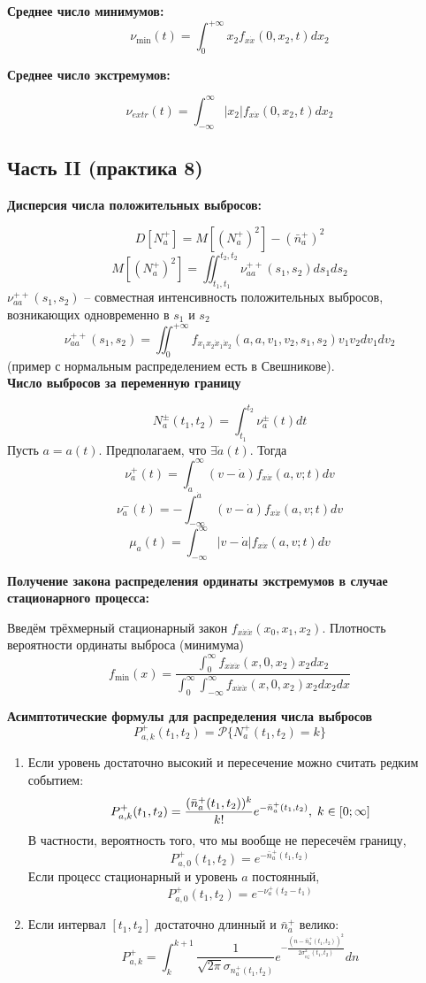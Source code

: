 \documentclass[a4paper,11pt, twocolumn]{article}
\begin{document}
\textbf{ Среднее число минимумов: }
\[ \nu_{\min} (t) = \int_{0}^{+ \infty} x_2 f_{x \dot x} (0, x_2, t) dx_2 \]

\textbf{ Среднее число экстремумов: }

\[ \nu_{extr}(t) = \int_{-\infty}^{\infty} |x_2| f_{x \dot x}(0, x_2, t) dx_2 \]

\subsection{ Часть II (практика 8) }

\textbf{Дисперсия числа положительных выбросов:}

\[ D[N_a^+] = M[(N_a^+)^2] - (\bar n_a^+)^2 \]
\[ M[(N_a^+)^2] = \iint_{t_1, t_1}^{t_2, t_2} \nu_{a a}^{++}(s_1, s_2) ds_1 ds_2 \]
$ \nu_{a a}^{++}(s_1, s_2) $ -- совместная интенсивность положительных выбросов, возникающих одновременно в $s_1$ и $s_2$
\[ \nu_{a a}^{++}(s_1, s_2) = \iint_0^{+\infty} f_{x_1 x_2 \dot x_1 \dot x_2} (a, a, v_1, v_2, s_1, s_2) v_1 v_2 d v_1 d v_2 \]
(пример с нормальным распределением есть в Свешникове). \\

\textbf{ Число выбросов за переменную границу }

\[ N_a^\pm (t_1, t_2) = \int_{t_1}^{t_2} \nu_a^{\pm}(t) dt \]
Пусть $ a = a(t) $.
Предполагаем, что $ \exists \dot a(t) $.
Тогда
\[ \nu_a^+(t) = \int_{\dot a}^{\infty} (v - \dot a) f_{x \dot x} (a,v; t) dv \]
\[ \nu_a^-(t) = - \int_{- \infty}^{\dot a} (v - \dot a) f_{x \dot x} (a,v; t) dv \]
\[ \mu_a(t) = \int_{- \infty}^{\infty} |v - \dot a| f_{x \dot x} (a,v; t) dv \]

\textbf{ Получение закона распределения ординаты экстремумов в случае стационарного процесса: }

Введём трёхмерный стационарный закон $ f_{x \dot x \ddot x}(x_0, x_1, x_2) $.
Плотность вероятности ординаты выброса (минимума)
\[ f_{\min}(x) = \frac{ \int_{0}^{\infty} f_{x \dot x \ddot x}(x, 0, x_2) x_2 d x_2 }{ \int_{0}^{\infty} \int_{- \infty}^{\infty} f_{x \dot x \ddot x}(x, 0, x_2) x_2 dx_2 dx } \]

\textbf{ Асимптотические формулы для распределения числа выбросов }
\[ P^+_{a,k}(t_1, t_2) = \mathcal{P}\{ N_a^+(t_1, t_2) = k \} \]
\begin{enumerate}[noitemsep]
    \item Если уровень достаточно высокий и пересечение можно считать редким событием:
    \[ P^+_{a,k}(t_1, t_2) = \frac{ (\bar n_a^+(t_1, t_2))^k }{ k! } e^{- \bar n_a^+(t_1, t_2)}, \thickspace k \in [ 0; \infty ] \]
    В частности, вероятность того, что мы вообще не пересечём границу,
    \[ P_{a,0}^+(t_1,t_2) = e^{ - \bar n_a^+(t_1, t_2) } \]
    Если процесс стационарный и уровень $ a $ постоянный,
    \[ P_{a,0}^+(t_1,t_2) = e^{ - \nu_a^+(t_2-t_1)} \]
    \item Если интервал $ [t_1,t_2] $ достаточно длинный и $ \bar n_a^+ $ велико:
    \[ P_{a,k}^+ = \int_{k}^{k+1} \frac{1}{\sqrt{2\pi} \sigma_{n_a^+(t_1,t_2)}} e^{- \frac{ (n - \bar n_a^+(t_1,t_2))^2 }{ 2 \sigma_{n_a^+}^2 (t_1,t_2) }} dn \]
\end{enumerate}


\end{document}
